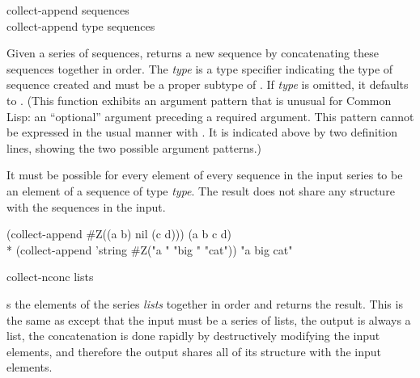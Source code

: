 \begin{defun}[Function]
collect-append sequences \\
collect-append type sequences

Given a series of sequences,  returns a new sequence by
concatenating these sequences together in order.  The {\it type} is a type
specifier indicating the type of sequence created and must be a proper
subtype of .  If {\it type} is omitted, it defaults to
.  (This function exhibits an argument pattern that is unusual for Common
Lisp:  an ``optional'' argument preceding a required argument.  This
pattern cannot be expressed in the usual manner with .  It
is indicated above by two definition lines, showing the two possible
argument patterns.)

It must be possible for every element of every sequence in the input series
to be an element of a sequence of type {\it type}.  The result does not
share any structure with the sequences in the input.
\begin{lisp}
(collect-append \#Z((a b) nil (c d))) {\EV} (a b c d) \\*
(collect-append 'string \#Z("a " "big " "cat")) {\EV} "a big cat"
\end{lisp}
\end{defun}

\begin{defun}[Function]
collect-nconc lists

 s the elements of the series {\it
lists} together in order and returns the result.  This is the same as
 except that the input must be a series of lists,
the output is always a list, the concatenation is done rapidly by
destructively modifying the input elements, and therefore the output
shares all of its structure with the input elements.
\end{defun}

